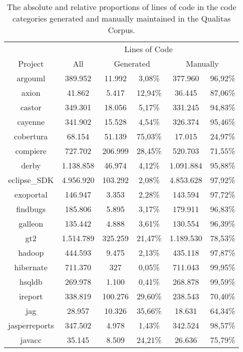 \setlength{\extrarowheight}{-.17em}
\begin{table}
	\caption[Lines of code distributions in the Qualitas Corpus.]{The absolute and relative proportions of lines of code in the code categories generated and manually maintained in the Qualitas Corpus.}
	\label{table:locQualitasCorpus}
	\begin{tabularx}{\textwidth}{c|c|c|c|c|c}
		& \multicolumn{5}{c}{Lines of Code}  \\
		Project & All & \multicolumn{2}{c|}{Generated} & \multicolumn{2}{c}{Manually}  \\
		\hline
		argouml & 389.952 & 11.992 & 3,08\% & 377.960 & 96,92\% \\
		axion & 41.862 & 5.417 & 12,94\% & 36.445 & 87,06\% \\
		castor & 349.301 & 18.056 & 5,17\% & 331.245 & 94,83\% \\
		cayenne & 341.902 & 15.528 & 4,54\% & 326.374 & 95,46\% \\
		cobertura & 68.154 & 51.139 & 75,03\% & 17.015 & 24,97\% \\
		compiere & 727.702 & 206.999 & 28,45\% & 520.703 & 71,55\% \\
		derby & 1.138.858 & 46.974 & 4,12\% & 1.091.884 & 95,88\% \\
		eclipse\_SDK & 4.956.920 & 103.292 & 2,08\% & 4.853.628 & 97,92\% \\
		exoportal & 146.947 & 3.353 & 2,28\% & 143.594 & 97,72\% \\
		findbugs & 185.806 & 5.895 & 3,17\% & 179.911 & 96,83\% \\
		galleon & 135.442 & 4.888 & 3,61\% & 130.554 & 96,39\% \\
		gt2 & 1.514.789 & 325.259 & 21,47\% & 1.189.530 & 78,53\% \\
		hadoop & 444.593 & 9.475 & 2,13\% & 435.118 & 97,87\% \\
		hibernate & 711.370 & 327 & 0,05\% & 711.043 & 99,95\% \\
		hsqldb & 269.978 & 1.100 & 0,41\% & 268.878 & 99,59\% \\
		ireport & 338.819 & 100.276 & 29,60\% & 238.543 & 70,40\% \\
		jag & 28.957 & 10.326 & 35,66\% & 18.631 & 64,34\% \\
		jasperreports & 347.502 & 4.978 & 1,43\% & 342.524 & 98,57\% \\
		javacc & 35.145 & 8.509 & 24,21\% & 26.636 & 75,79\% \\

\end{tabularx}
\end{table}
